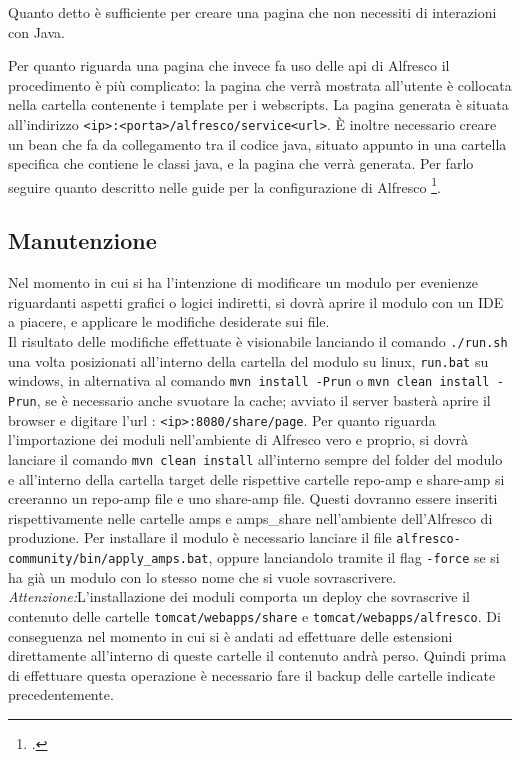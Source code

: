 Quanto detto è sufficiente per creare una pagina che non necessiti di interazioni con Java.

Per quanto riguarda una pagina che invece fa uso delle api di Alfresco il procedimento è più complicato: la pagina che verrà mostrata all’utente è collocata nella cartella contenente i template per i webscripts.
La pagina generata è situata all’indirizzo \texttt{<ip>:<porta>/alfresco/service<url>}.
È inoltre necessario creare un bean che fa da collegamento tra il codice java, situato appunto in una cartella specifica che contiene le classi java, e la pagina che verrà generata. Per farlo seguire quanto descritto nelle guide per la configurazione di Alfresco \footcite{site:alfresco-bean}.

\subsection{Manutenzione}
Nel momento in cui si ha l'intenzione di modificare un modulo per evenienze riguardanti aspetti grafici o logici indiretti, si dovrà aprire il modulo con un IDE a piacere, e applicare le modifiche desiderate sui file.\\
 Il risultato delle modifiche effettuate è visionabile lanciando il comando \texttt{./run.sh} una volta posizionati all’interno della cartella del modulo su linux, \texttt{run.bat} su windows, in alternativa al comando \texttt{mvn install -Prun}  o  \texttt{mvn clean install -Prun}, se è necessario anche svuotare la cache; avviato il server basterà
aprire il browser e digitare l’url : \texttt{<ip>:8080/share/page}.
Per quanto riguarda l’importazione dei moduli nell'ambiente di Alfresco vero e proprio, si dovrà lanciare il comando \texttt{mvn clean install} all'interno sempre del folder del modulo e all’interno della cartella target delle rispettive cartelle repo-amp e share-amp si creeranno un repo-amp file e uno share-amp file. Questi dovranno essere inseriti rispettivamente nelle cartelle amps e amps\_share nell'ambiente dell'Alfresco di produzione.
Per installare il modulo  è necessario lanciare il file \texttt{alfresco-community/bin/apply\_amps.bat}, oppure lanciandolo tramite il flag \texttt{-force} se si ha già un modulo con lo stesso nome che si vuole sovrascrivere.\\
\emph{Attenzione:}L’installazione dei moduli comporta un deploy che sovrascrive il contenuto delle cartelle
\texttt{tomcat/webapps/share} e \texttt{tomcat/webapps/alfresco}. Di conseguenza nel momento in cui si è andati ad effettuare delle estensioni direttamente all’interno di queste cartelle il contenuto andrà perso. Quindi prima di effettuare questa operazione è necessario fare il backup delle cartelle indicate precedentemente.


